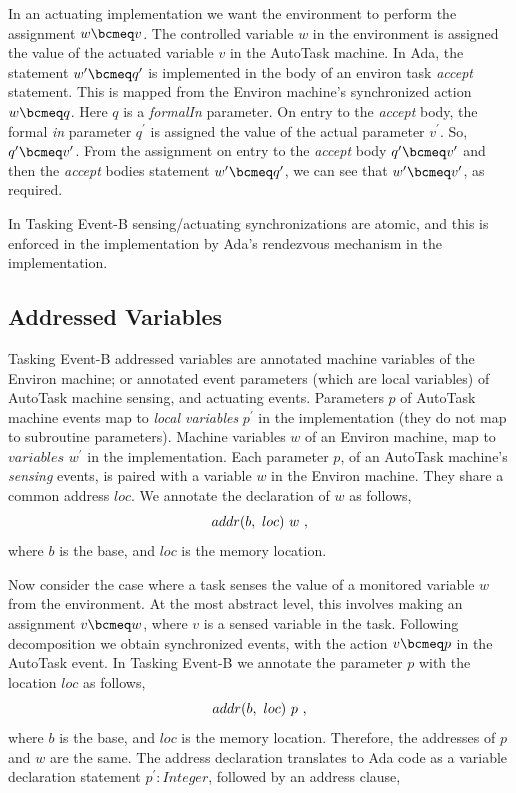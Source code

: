 In an actuating implementation we want the environment to perform the assignment $w \bcmeq v$. The controlled variable $w$ in the environment is assigned the value of the actuated variable $v$ in the AutoTask machine. In Ada, the statement $w^\prime \bcmeq q^\prime$ is implemented in the body of an environ task \emph{accept} statement. This is mapped from the Environ machine's synchronized action $w \bcmeq q$. Here $q$ is a \emph{formalIn} parameter. On entry to the \emph{accept} body, the formal \emph{in} parameter $q^\prime$ is assigned the value of the actual parameter $v^\prime$. So, $q^\prime\bcmeq v^\prime$. From the assignment on entry to the \emph{accept} body $q^\prime\bcmeq v^\prime$ and then the \emph{accept} bodies statement $w^\prime \bcmeq q^\prime$, we can see that $w^\prime\bcmeq v^\prime$, as required. 

In Tasking Event-B sensing/actuating synchronizations are atomic, and this is enforced in the implementation by Ada's rendezvous mechanism in the implementation.
%
\subsection{Addressed Variables}
Tasking Event-B addressed variables are annotated machine variables of the Environ machine; or annotated event parameters (which are local variables) of AutoTask machine sensing, and actuating events. Parameters $p$ of AutoTask machine events map to \emph{local variables} $p^\prime$ in the implementation (they do not map to subroutine parameters).
Machine variables $w$ of an Environ machine, map to $variables$ $w^\prime$ in the implementation. Each parameter $p$, of an AutoTask machine's \emph{sensing} events, is paired with a variable $w$ in the Environ machine. They share a common address $loc$. We annotate the declaration of $w$ as follows,
%
\begin{equation}
addr(b,~loc)~w~,
\notag
\end{equation}
% 
where $b$ is the base, and $loc$ is the memory location. 

Now consider the case where a task senses the value of a monitored variable $w$ from the environment. At the most abstract level, this involves making an assignment $v\bcmeq w$, where $v$ is a sensed variable in the task. Following decomposition we obtain synchronized events, with the action $v\bcmeq p$ in the AutoTask event. In Tasking Event-B we annotate the parameter $p$ with the location $loc$ as follows, 
%
\begin{equation}
addr(b,~loc)~p~,
\notag
\end{equation}
% 
where $b$ is the base, and $loc$ is the memory location. Therefore, the addresses of $p$ and $w$ are the same. The address declaration translates to Ada code as a variable declaration statement $p^\prime : Integer$, followed by an address clause, 

